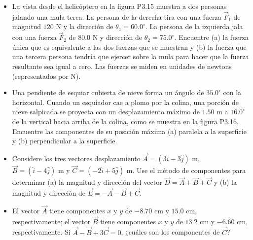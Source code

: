 \documentclass[11pt,a4paper]{article}
\begin{document}
\begin{itemize}
    \item[\textbf{15.}] La vista desde el helicóptero en la figura P3.15 muestra a dos personas jalando una mula terca. La persona de la derecha tira con una fuerza $\vec{F}_1$ de magnitud $120 \text{ N}$ y la dirección de $\theta_1 = 60.0^\circ$. La persona de la izquierda jala con una fuerza $\vec{F}_2$ de $80.0 \text{ N}$ y dirección de $\theta_2 = 75.0^\circ$. Encuentre (a) la fuerza única que es equivalente a las dos fuerzas que se muestran y (b) la fuerza que una tercera persona tendría que ejercer sobre la mula para hacer que la fuerza resultante sea igual a cero. Las fuerzas se miden en unidades de newtons (representados por N).
    \vspace*{6cm}

    \item[\textbf{16.}] Una pendiente de esquiar cubierta de nieve forma un ángulo de $35.0^\circ$ con la horizontal. Cuando un esquiador cae a plomo por la colina, una porción de nieve salpicada se proyecta con un desplazamiento máximo de $1.50 \text{ m}$ a $16.0^\circ$ de la vertical hacia arriba de la colina, como se muestra en la figura P3.16. Encuentre las componentes de su posición máxima (a) paralela a la superficie y (b) perpendicular a la superficie.
    \vspace*{6cm}

    \item[\textbf{17.}] Considere los tres vectores desplazamiento $\vec{A} = (3\hat{i} - 3\hat{j}) \text{ m}$, $\vec{B} = (\hat{i} - 4\hat{j}) \text{ m}$ y $\vec{C} = (-2\hat{i} + 5\hat{j}) \text{ m}$. Use el método de componentes para determinar (a) la magnitud y dirección del vector $\vec{D} = \vec{A} + \vec{B} + \vec{C}$ y (b) la magnitud y dirección de $\vec{E} = -\vec{A} - \vec{B} + \vec{C}$.
    \vspace*{6cm}

    \item[\textbf{18.}] El vector $\vec{A}$ tiene componentes $x$ y $y$ de $-8.70 \text{ cm}$ y $15.0 \text{ cm}$, respectivamente; el vector $\vec{B}$ tiene componentes $x$ y $y$ de $13.2 \text{ cm}$ y $-6.60 \text{ cm}$, respectivamente. Si $\vec{A} - \vec{B} + 3\vec{C} = 0$, ¿cuáles son los componentes de $\vec{C}$?
    \vspace*{6cm}
\end{itemize}

\newpage
\end{document}
